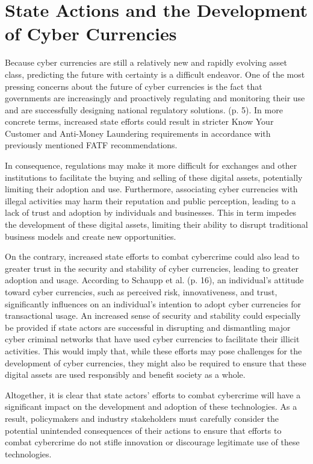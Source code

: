 \chapter{State Actions and the Development of Cyber Currencies}

Because cyber currencies are still a relatively new and rapidly evolving asset class, predicting the future with certainty is a difficult endeavor. One of the most pressing concerns about the future of cyber currencies is the fact that governments are increasingly and proactively regulating and monitoring their use and are successfully designing national regulatory solutions. \cite{ferreira_eu_2021} (p. 5). In more concrete terms, increased state efforts could result in stricter Know Your Customer and Anti-Money Laundering requirements in accordance with previously mentioned FATF recommendations.

In consequence, regulations may make it more difficult for exchanges and other institutions to facilitate the buying and selling of these digital assets, potentially limiting their adoption and use. Furthermore, associating cyber currencies with illegal activities may harm their reputation and public perception, leading to a lack of trust and adoption by individuals and businesses. This in term impedes the development of these digital assets, limiting their ability to disrupt traditional business models and create new opportunities. 

On the contrary, increased state efforts to combat cybercrime could also lead to greater trust in the security and stability of cyber currencies, leading to greater adoption and usage. According to Schaupp et al. \cite{schaupp_regulation_2022} (p. 16), an individual's attitude toward cyber currencies, such as perceived risk, innovativeness, and trust, significantly influences on an individual's intention to adopt cyber currencies for transactional usage. An increased sense of security and stability could especially be provided if state actors are successful in disrupting and dismantling major cyber criminal networks that have used cyber currencies to facilitate their illicit activities. This would imply that, while these efforts may pose challenges for the development of cyber currencies, they might also be required to ensure that these digital assets are used responsibly and benefit society as a whole.

Altogether, it is clear that state actors' efforts to combat cybercrime will have a significant impact on the development and adoption of these technologies. As a result, policymakers and industry stakeholders must carefully consider the potential unintended consequences of their actions to ensure that efforts to combat cybercrime do not stifle innovation or discourage legitimate use of these technologies.

